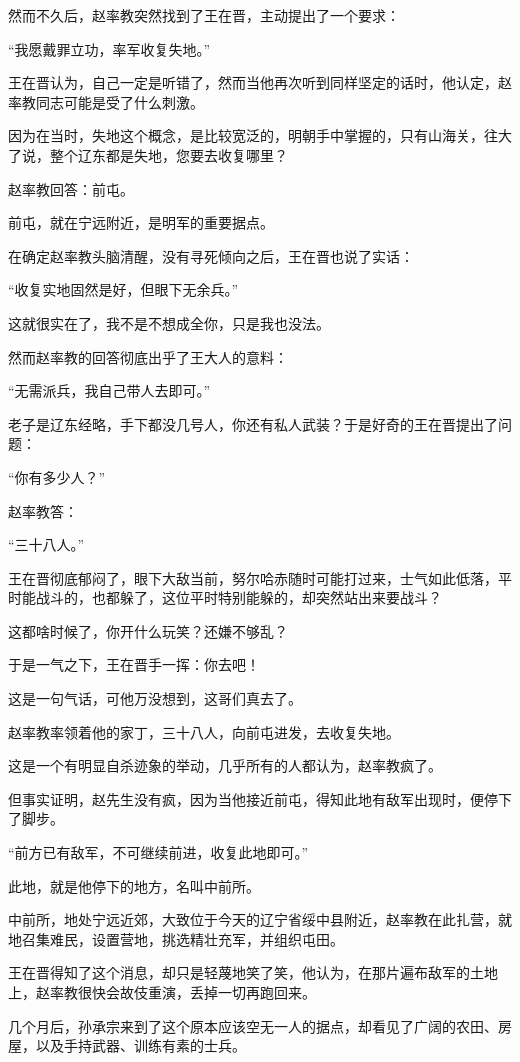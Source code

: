 \begin{multicols}{\theparacolNo}
		然而不久后，赵率教突然找到了王在晋，主动提出了一个要求：

		“我愿戴罪立功，率军收复失地。”

		王在晋认为，自己一定是听错了，然而当他再次听到同样坚定的话时，他认定，赵率教同志可能是受了什么刺激。

		因为在当时，失地这个概念，是比较宽泛的，明朝手中掌握的，只有山海关，往大了说，整个辽东都是失地，您要去收复哪里？

		赵率教回答：前屯。

		前屯，就在宁远附近，是明军的重要据点。

		在确定赵率教头脑清醒，没有寻死倾向之后，王在晋也说了实话：

		“收复实地固然是好，但眼下无余兵。”

		这就很实在了，我不是不想成全你，只是我也没法。

		然而赵率教的回答彻底出乎了王大人的意料：

		“无需派兵，我自己带人去即可。”

		老子是辽东经略，手下都没几号人，你还有私人武装？于是好奇的王在晋提出了问题：

		“你有多少人？”

		赵率教答：

		“三十八人。”

		王在晋彻底郁闷了，眼下大敌当前，努尔哈赤随时可能打过来，士气如此低落，平时能战斗的，也都躲了，这位平时特别能躲的，却突然站出来要战斗？

		这都啥时候了，你开什么玩笑？还嫌不够乱？

		于是一气之下，王在晋手一挥：你去吧！

		这是一句气话，可他万没想到，这哥们真去了。

		赵率教率领着他的家丁，三十八人，向前屯进发，去收复失地。

		这是一个有明显自杀迹象的举动，几乎所有的人都认为，赵率教疯了。

		但事实证明，赵先生没有疯，因为当他接近前屯，得知此地有敌军出现时，便停下了脚步。

		“前方已有敌军，不可继续前进，收复此地即可。”

		此地，就是他停下的地方，名叫中前所。

		中前所，地处宁远近郊，大致位于今天的辽宁省绥中县附近，赵率教在此扎营，就地召集难民，设置营地，挑选精壮充军，并组织屯田。

		王在晋得知了这个消息，却只是轻蔑地笑了笑，他认为，在那片遍布敌军的土地上，赵率教很快会故伎重演，丢掉一切再跑回来。

		几个月后，孙承宗来到了这个原本应该空无一人的据点，却看见了广阔的农田、房屋，以及手持武器、训练有素的士兵。


\end{multicols}

